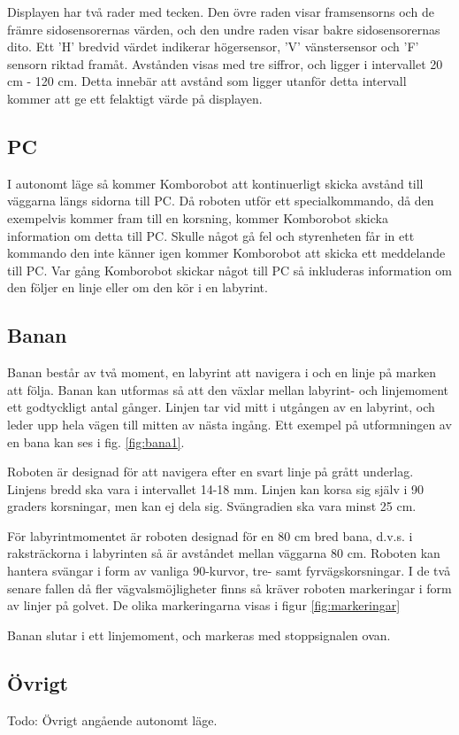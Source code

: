 
Displayen har två rader med tecken. Den övre raden visar framsensorns och de främre sidosensorernas värden, och den undre raden visar bakre sidosensorernas dito. Ett 'H' bredvid värdet indikerar högersensor, 'V' vänstersensor och 'F' sensorn riktad framåt. Avstånden visas med tre siffror, och ligger i intervallet 20 cm - 120 cm. Detta innebär att avstånd som ligger utanför detta intervall kommer att ge ett felaktigt värde på displayen. 

\subsection{PC}
I autonomt läge så kommer Komborobot att kontinuerligt skicka avstånd till
väggarna längs sidorna till PC. Då roboten utför ett specialkommando, då den
exempelvis kommer fram till en korsning,  kommer Komborobot skicka information om
detta till PC. Skulle något gå fel och styrenheten får in ett kommando den inte
känner igen kommer Komborobot att skicka ett meddelande till PC. Var gång
Komborobot skickar något till PC så inkluderas information om den följer en
linje eller om den kör i en labyrint.
\subsection{Banan}
\label{sec:banan}

Banan består av två moment, en labyrint att navigera i och en linje på marken att följa. Banan kan utformas så att den växlar mellan labyrint- och linjemoment ett godtyckligt antal gånger. Linjen tar vid mitt i utgången av en labyrint, och leder upp hela vägen till mitten av nästa ingång. Ett exempel på utformningen av en bana kan ses i fig. \ref{fig:bana1}.


Roboten är designad för att navigera efter en svart linje på grått underlag. Linjens bredd ska vara i intervallet 14-18 mm. Linjen kan korsa sig själv i 90 graders korsningar, men kan ej dela sig. Svängradien ska vara minst 25 cm. 

För labyrintmomentet är roboten designad för en 80 cm bred bana, d.v.s. i raksträckorna i labyrinten så är avståndet mellan väggarna 80 cm. Roboten kan hantera svängar i form av vanliga 90\degree-kurvor, tre- samt fyrvägskorsningar. I de två senare fallen då fler vägvalsmöjligheter finns så kräver roboten markeringar i form av linjer på golvet. De olika markeringarna visas i figur \ref{fig:markeringar}


Banan slutar i ett linjemoment, och markeras med stoppsignalen ovan. 

\subsection{Övrigt}
Todo: Övrigt angående autonomt läge.


